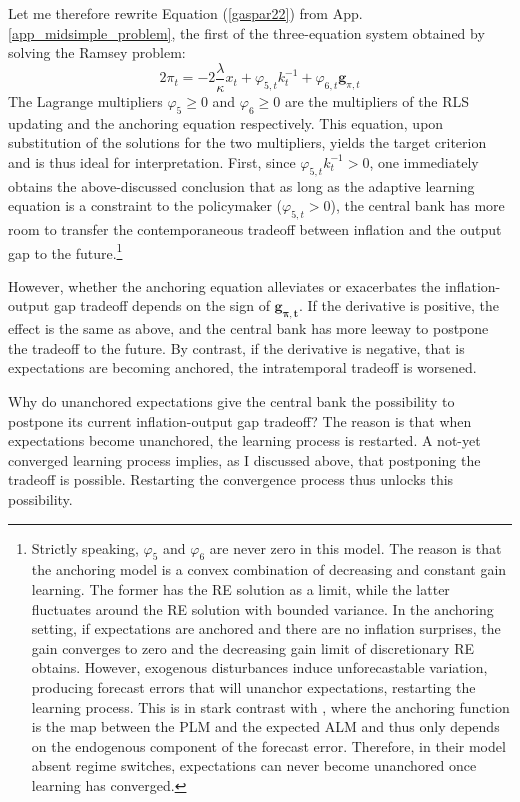 \documentclass[11pt]{article}
\renewcommand{\[}{\begin{equation}}
\renewcommand{\]}{\end{equation}}
\begin{document}
Let me therefore rewrite Equation (\ref{gaspar22}) from App. \ref{app_midsimple_problem}, the first of the three-equation system obtained by solving the Ramsey problem:
\begin{equation}
2\pi_t = - 2\frac{\lambda}{\kappa}x_t +\varphi_{5,t} k_t^{-1} + \varphi_{6,t} \mathbf{g}_{\pi,t} 
\end{equation}
The Lagrange multipliers $\varphi_5 \geq 0$ and $\varphi_6 \geq 0$ are the multipliers of the RLS updating and the anchoring equation respectively. This equation, upon substitution of the solutions for the two multipliers, yields the target criterion and is thus ideal for interpretation. First, since $\varphi_{5,t}k_t^{-1} > 0$, one immediately obtains the above-discussed conclusion that as long as the adaptive learning equation is a constraint to the policymaker ($\varphi_{5,t} > 0$), the central bank has more room to transfer the contemporaneous tradeoff between inflation and the output gap to the future.\footnote{Strictly speaking, $\varphi_5$ and $\varphi_6$ are never zero in this model. The reason is that the anchoring model is a convex combination of decreasing and constant gain learning. The former has the RE solution as a limit, while the latter fluctuates around the RE solution with bounded variance. In the anchoring setting, if expectations are anchored and there are no inflation surprises, the gain converges to zero and the decreasing gain limit of discretionary RE obtains. However, exogenous disturbances induce unforecastable variation, producing forecast errors that will unanchor expectations, restarting the learning process. This is in stark contrast with \cite{carvalho2019anchored}, where the anchoring function is the map between the PLM and the expected ALM and thus only depends on the endogenous component of the forecast error. Therefore, in their model absent regime switches, expectations can never become unanchored once learning has converged.}

However, whether the anchoring equation alleviates or exacerbates the inflation-output gap tradeoff depends on the sign of $\mathbf{g_{\pi,t}}$. If the derivative is positive, the effect is the same as above, and the central bank has more leeway to postpone the tradeoff to the future. By contrast, if the derivative is negative, that is expectations are becoming anchored, the intratemporal tradeoff is worsened.

Why do unanchored expectations give the central bank the possibility to postpone its current inflation-output gap tradeoff? The reason is that when expectations become unanchored, the learning process is restarted. A not-yet converged learning process implies, as I discussed above, that postponing the tradeoff is possible. Restarting the convergence process thus unlocks this possibility. 
\end{document}
